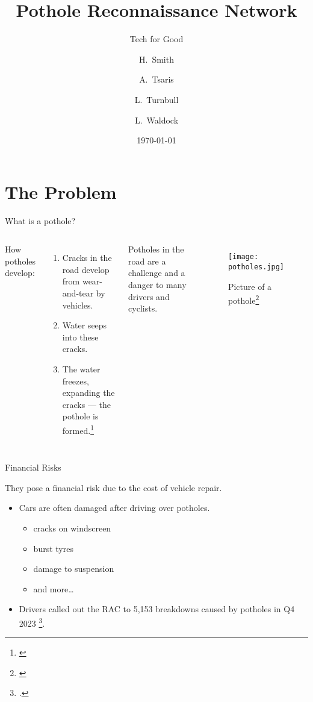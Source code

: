 \documentclass{beamer}
\title{Pothole Reconnaissance Network}
\subtitle{Tech for Good}
\author[Smith, Tsaris, Turnbull, Waldock]{H.~Smith \and A.~Tsaris \and L.~Turnbull \and L.~Waldock}
\institute[5J]{Group 5J}
\date{\today}
\begin{document}
\frame{\titlepage}

\section{The Problem}

\begin{frame}{What is a pothole?}

\begin{columns}


How potholes develop:
\begin{enumerate}
    \item Cracks in the road develop from wear-and-tear by vehicles.
    \item Water seeps into these cracks.
    \item The water freezes, expanding the cracks --- the pothole is formed.\footnote[frame]{\cite{how-are-potholes-formed}}
\end{enumerate}
Potholes in the road are a challenge and a danger to many drivers and cyclists.

\begin{figure}
    \texttt{[image: potholes.jpg]}
    \caption{Picture of a pothole\footnote[frame]{\cite{pothole-pic}}}
\end{figure}

\end{columns}

\end{frame}

\begin{frame}{Financial Risks}

    They pose a \alert{financial} risk due to the cost of vehicle repair.

    \begin{itemize}
        \item Cars are often damaged after driving over potholes.
        \begin{itemize}
            \item cracks on windscreen
            \item burst tyres
            \item damage to suspension
            \item and more…
        \end{itemize}
        \item Drivers called out the RAC to 5,153 breakdowns caused by potholes in Q4 2023 \footcite{car-breakdowns}.
    \end{itemize}
\end{frame}
\end{document}
